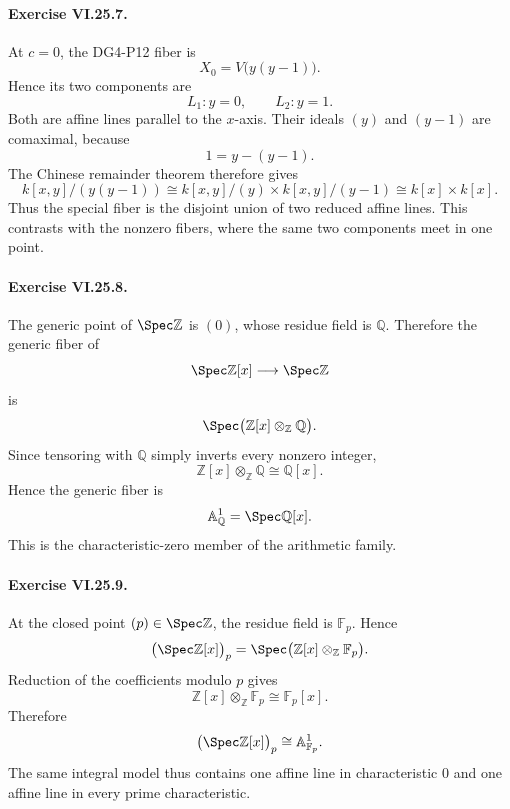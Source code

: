 \paragraph{Exercise VI.25.7.}
\begin{solution}
At \(c=0\), the DG4-P12 fiber is
\[
X_0=V\bigl(y(y-1)\bigr).
\]
Hence its two components are
\[
L_1: y=0,\qquad L_2:y=1.
\]
Both are affine lines parallel to the \(x\)-axis.  Their ideals \((y)\) and \((y-1)\) are comaximal, because
\[
1=y-(y-1).
\]
The Chinese remainder theorem therefore gives
\[
k[x,y]/(y(y-1))
\cong
k[x,y]/(y)\times k[x,y]/(y-1)
\cong
k[x]\times k[x].
\]
Thus the special fiber is the disjoint union of two reduced affine lines.  This contrasts with the nonzero fibers, where the same two components meet in one point.
\end{solution}

\paragraph{Exercise VI.25.8.}
\begin{solution}
The generic point of \(\Spec\mathbb Z\) is \((0)\), whose residue field is \(\mathbb Q\).  Therefore the generic fiber of
\[
\Spec\mathbb Z[x]\longrightarrow\Spec\mathbb Z
\]
is
\[
\Spec\bigl(\mathbb Z[x]\otimes_{\mathbb Z}\mathbb Q\bigr).
\]
Since tensoring with \(\mathbb Q\) simply inverts every nonzero integer,
\[
\mathbb Z[x]\otimes_{\mathbb Z}\mathbb Q\cong\mathbb Q[x].
\]
Hence the generic fiber is
\[
\mathbb A^1_{\mathbb Q}=\Spec\mathbb Q[x].
\]
This is the characteristic-zero member of the arithmetic family.
\end{solution}

\paragraph{Exercise VI.25.9.}
\begin{solution}
At the closed point \((p)\in\Spec\mathbb Z\), the residue field is \(\mathbb F_p\).  Hence
\[
\bigl(\Spec\mathbb Z[x]\bigr)_p
=
\Spec\bigl(\mathbb Z[x]\otimes_{\mathbb Z}\mathbb F_p\bigr).
\]
Reduction of the coefficients modulo \(p\) gives
\[
\mathbb Z[x]\otimes_{\mathbb Z}\mathbb F_p\cong\mathbb F_p[x].
\]
Therefore
\[
\bigl(\Spec\mathbb Z[x]\bigr)_p\cong\mathbb A^1_{\mathbb F_p}.
\]
The same integral model thus contains one affine line in characteristic \(0\) and one affine line in every prime characteristic.
\end{solution}


